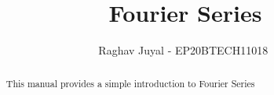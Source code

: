\documentclass[journal,12pt,twocolumn]{IEEEtran}
\renewcommand\thesection{\arabic{section}}
\begin{document}
\let\StandardTheFigure\thefigure
\renewcommand{\thefigure}{\theproblem}



\def\putbox#1#2#3{\makebox[0in][l]{\makebox[#1][l]{}\raisebox{\baselineskip}[0in][0in]{\raisebox{#2}[0in][0in]{#3}}}}
     \def\rightbox#1{\makebox[0in][r]{#1}}
     \def\centbox#1{\makebox[0in]{#1}}
     \def\topbox#1{\raisebox{-\baselineskip}[0in][0in]{#1}}
     \def\midbox#1{\raisebox{-0.5\baselineskip}[0in][0in]{#1}}

\vspace{3cm}

\title{ 
Fourier Series
}


%
%
%

\author{ Raghav Juyal - EP20BTECH11018 $^{}$}

\maketitle


\tableofcontents


\renewcommand{\thefigure}{\theenumi}
\renewcommand{\thetable}{\theenumi}



\bigskip

\begin{abstract}
This manual provides a simple introduction to Fourier Series
\end{abstract}
\end{document}
